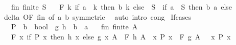 \begin{isabellebody}
\ \ \ fin{\isacharcolon}{\kern0pt}\ {\isachardoublequoteopen}finite\ S{\isachardoublequoteclose}\isanewline
\ \ \ {\isachardoublequoteopen}F\ {\isacharparenleft}{\kern0pt}{\isasymlambda}k{\isachardot}{\kern0pt}\ if\ a\ {\isacharequal}{\kern0pt}\ k\ then\ b\ k\ else\ \ S\ {\isacharequal}{\kern0pt}\ {\isacharparenleft}{\kern0pt}if\ a\ {\isasymin}\ S\ then\ b\ a\ else\ \isanewline
%
\isadelimproof
\ \ %
\endisadelimproof
%
\isatagproof
{}\isamarkupfalse%
\ delta\ {\isacharbrackleft}{\kern0pt}OF\ fin{\isacharcomma}{\kern0pt}\ of\ a\ b{\isacharcomma}{\kern0pt}\ symmetric{\isacharbrackright}{\kern0pt}\ \isamarkupfalse%
\ {\isacharparenleft}{\kern0pt}auto\ intro{\isacharcolon}{\kern0pt}\ cong{\isacharparenright}{\kern0pt}%
\endisatagproof
{\isafoldproof}%
%
\isadelimproof
\isanewline
%
\endisadelimproof
\isanewline
{}\isamarkupfalse%
\ If{\isacharunderscore}{\kern0pt}cases{\isacharcolon}{\kern0pt}\isanewline
\ \ \ P\ {\isacharcolon}{\kern0pt}{\isacharcolon}{\kern0pt}\ {\isachardoublequoteopen}{\isacharprime}{\kern0pt}b\ {\isasymRightarrow}\ bool{\isachardoublequoteclose}\ \ g\ h\ {\isacharcolon}{\kern0pt}{\isacharcolon}{\kern0pt}\ {\isachardoublequoteopen}{\isacharprime}{\kern0pt}b\ {\isasymRightarrow}\ {\isacharprime}{\kern0pt}a{\isachardoublequoteclose}\isanewline
\ \ \ fin{\isacharcolon}{\kern0pt}\ {\isachardoublequoteopen}finite\ A{\isachardoublequoteclose}\isanewline
\ \ \ {\isachardoublequoteopen}F\ {\isacharparenleft}{\kern0pt}{\isasymlambda}x{\isachardot}{\kern0pt}\ if\ P\ x\ then\ h\ x\ else\ g\ x{\isacharparenright}{\kern0pt}\ A\ {\isacharequal}{\kern0pt}\ F\ h\ {\isacharparenleft}{\kern0pt}A\ {\isasyminter}\ {\isacharbraceleft}{\kern0pt}x{\isachardot}{\kern0pt}\ P\ x{\isacharbraceright}{\kern0pt}{\isacharparenright}{\kern0pt}\ \isactrlbold {\isacharasterisk}{\kern0pt}\ F\ g\ {\isacharparenleft}{\kern0pt}A\ {\isasyminter}\ {\isacharminus}{\kern0pt}\ {\isacharbraceleft}{\kern0pt}x{\isachardot}{\kern0pt}\ P\ x{\isacharbraceright}{\kern0pt}{\isacharparenright}{\kern0pt}{\isachardoublequoteclose}\isanewline
%
\isadelimproof
%
\endisadelimproof
%
\isatagproof
{}\isamarkupfalse%
\ {\isacharminus}{\kern0pt}\isanewline
\ \ \isamarkupfalse%

\end{isabellebody}
